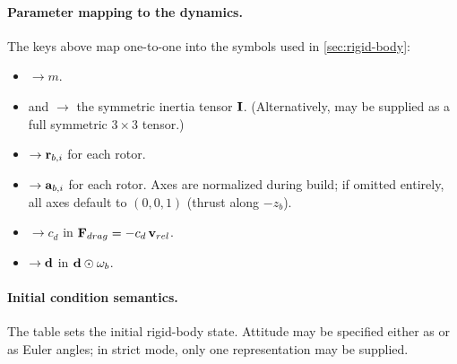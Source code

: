\paragraph{Parameter mapping to the dynamics.}
The keys above map one-to-one into the symbols used in \cref{sec:rigid-body}:
\begin{itemize}[leftmargin=*,itemsep=2pt]
  \item {} \(\rightarrow m\).
  \item {} and  \(\rightarrow\) the symmetric inertia tensor \(\mathbf{I}\). (Alternatively,  may be supplied as a full symmetric \(3\times 3\) tensor.)
  \item {} \(\rightarrow \mathbf{r}_{b,i}\) for each rotor.
  \item {} \(\rightarrow \mathbf{a}_{b,i}\) for each rotor. Axes are normalized during build; if omitted entirely, all axes default to \((0,0,1)\) (thrust along \(-z_b\)).
  \item {} \(\rightarrow c_d\) in \(\mathbf{F}_{drag}=-c_d\,\mathbf{v}_{rel}\).
  \item {} \(\rightarrow \mathbf{d}\) in \(\mathbf{d}\odot\mathbf{\omega}_b\).
\end{itemize}

\paragraph{Initial condition semantics.}
The \code{[airframe.x0]} table sets the initial rigid-body state. Attitude may be specified either as  or as Euler angles; in strict mode, only one representation may be supplied.
